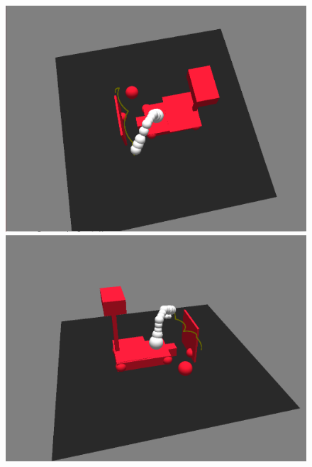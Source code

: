 \documentclass[conference]{IEEEtran}
\begin{document}
\begin{figure}[h!]
\begin{center}
\begin{minipage}[b]{0.32\linewidth}
	\begin{center}\includegraphics[angle=0,width=\linewidth]{images/av7.png}\end{center}
\end{minipage}\hfill
\begin{minipage}[b]{0.32\linewidth}
	\begin{center}\includegraphics[angle=0,width=\linewidth]{images/av8.png}\end{center}
\end{minipage}\hfill
\begin{minipage}[b]{0.32\linewidth}

\end{minipage}
\end{center}
\end{figure}
\end{document}

